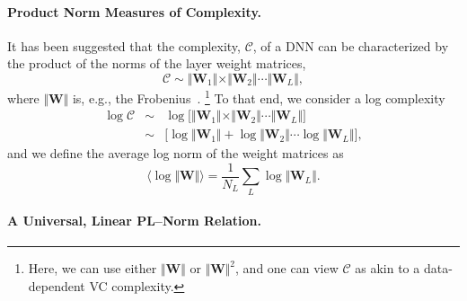 

\paragraph{Product Norm Measures of Complexity.} 

It has been suggested that the complexity, $\mathcal{C}$, of a DNN can be characterized by the product of the norms of the layer weight matrices,
$$
\mathcal{C}\sim\Vert\mathbf{W}_{1}\Vert\times\Vert\mathbf{W}_{2}\Vert\cdots\Vert\mathbf{W}_{L}\Vert ,
$$
where $\Vert\mathbf{W}\Vert$ is, e.g., the Frobenius~\cite{XXX-XXX,XXX-XXX,XXX-XXX}.%
\footnote{Here, we can use either $\Vert\mathbf{W}\Vert$ or $\Vert\mathbf{W}\Vert^{2}$,
and one can view $\mathcal{C}$ as akin to a data-dependent VC complexity.}
%
To that end, we consider a log complexity
\begin{eqnarray*}
\log\mathcal{C} &\sim& \log\bigg[\Vert\mathbf{W}_{1}\Vert\times\Vert\mathbf{W}_{2}\Vert\cdots\Vert\mathbf{W}_{L}\Vert\bigg]  \\
                &\sim& \bigg[\log\Vert\mathbf{W}_{1}\Vert+\log\Vert\mathbf{W}_{2}\Vert\cdots\log\Vert\mathbf{W}_{L}\Vert\bigg]  ,
\end{eqnarray*}
and we define the average log norm of the weight matrices as
\begin{equation}
\langle\log\Vert\mathbf{W}\Vert\rangle=\dfrac{1}{N_{L}}\sum_{L}\log\Vert\mathbf{W}_{L}\Vert  .
\label{eqn:av_log_norm}
\end{equation}


\paragraph{A Universal, Linear PL--Norm Relation.} 

